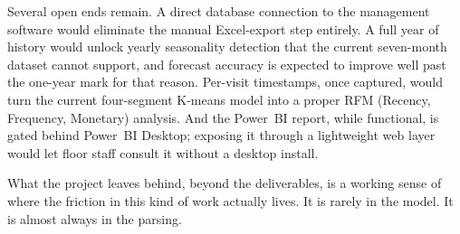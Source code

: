 Several open ends remain. A direct database connection to the management
software would eliminate the manual Excel-export step entirely. A full year of
history would unlock yearly seasonality detection that the current seven-month
dataset cannot support, and forecast accuracy is expected to improve well past
the one-year mark for that reason. Per-visit timestamps, once captured, would
turn the current four-segment K-means model into a proper RFM (Recency,
Frequency, Monetary) analysis. And the Power~BI report, while functional, is
gated behind Power~BI Desktop; exposing it through a lightweight web layer
would let floor staff consult it without a desktop install.

What the project leaves behind, beyond the deliverables, is a working sense of
where the friction in this kind of work actually lives. It is rarely in the
model. It is almost always in the parsing.

